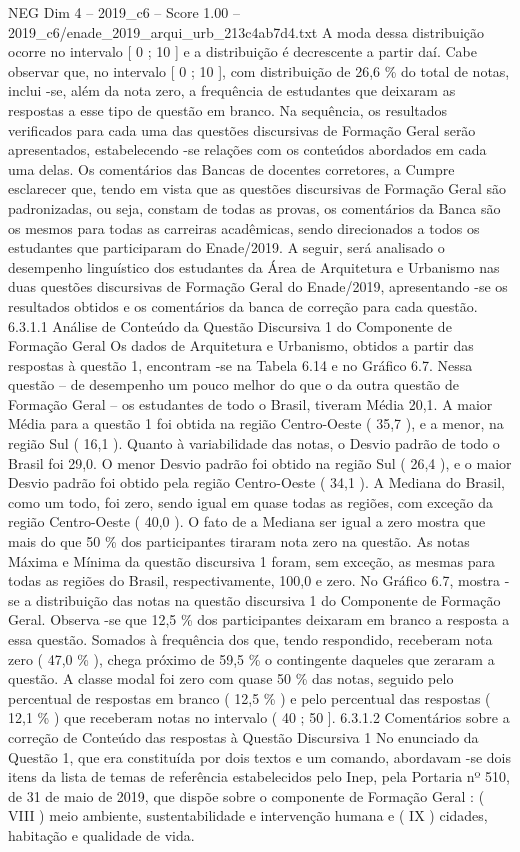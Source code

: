 \begin{textsample}{NEG Dim 4 – 2019\_c6 – Score 1.00 – 2019\_c6/enade\_2019\_arqui\_urb\_213c4ab7d4.txt}
A moda dessa distribuição ocorre no intervalo [ 0 ; 10 ] e a distribuição é decrescente a partir daí.
Cabe observar que, no intervalo [ 0 ; 10 ], com distribuição de 26,6 \% do total de notas, inclui -se, além da nota zero, a frequência de estudantes que deixaram as respostas a esse tipo de questão em branco.
Na sequência, os resultados verificados para cada uma das questões discursivas de Formação Geral serão apresentados, estabelecendo -se relações com os conteúdos abordados em cada uma delas.
Os comentários das Bancas de docentes corretores, a Cumpre esclarecer que, tendo em vista que as questões discursivas de Formação Geral são padronizadas, ou seja, constam de todas as provas, os comentários da Banca são os mesmos para todas as carreiras acadêmicas, sendo direcionados a todos os estudantes que participaram do Enade/2019.
A seguir, será analisado o desempenho linguístico dos estudantes da Área de Arquitetura e Urbanismo nas duas questões discursivas de Formação Geral do Enade/2019, apresentando -se os resultados obtidos e os comentários da banca de correção para cada questão. 6.3.1.1 Análise de Conteúdo da Questão Discursiva 1 do Componente de Formação Geral Os dados de Arquitetura e Urbanismo, obtidos a partir das respostas à questão 1, encontram -se na Tabela 6.14 e no Gráfico 6.7.
Nessa questão – de desempenho um pouco melhor do que o da outra questão de Formação Geral – os estudantes de todo o Brasil, tiveram Média 20,1.
A maior Média para a questão 1 foi obtida na região Centro-Oeste ( 35,7 ), e a menor, na região Sul ( 16,1 ).
Quanto à variabilidade das notas, o Desvio padrão de todo o Brasil foi 29,0.
O menor Desvio padrão foi obtido na região Sul ( 26,4 ), e o maior Desvio padrão foi obtido pela região Centro-Oeste ( 34,1 ).
A Mediana do Brasil, como um todo, foi zero, sendo igual em quase todas as regiões, com exceção da região Centro-Oeste ( 40,0 ).
O fato de a Mediana ser igual a zero mostra que mais do que 50 \% dos participantes tiraram nota zero na questão.
As notas Máxima e Mínima da questão discursiva 1 foram, sem exceção, as mesmas para todas as regiões do Brasil, respectivamente, 100,0 e zero.
No Gráfico 6.7, mostra -se a distribuição das notas na questão discursiva 1 do Componente de Formação Geral.
Observa -se que 12,5 \% dos participantes deixaram em branco a resposta a essa questão.
Somados à frequência dos que, tendo respondido, receberam nota zero ( 47,0 \% ), chega próximo de 59,5 \% o contingente daqueles que zeraram a questão.
A classe modal foi zero com quase 50 \% das notas, seguido pelo percentual de respostas em branco ( 12,5 \% ) e pelo percentual das respostas ( 12,1 \% ) que receberam notas no intervalo ( 40 ; 50 ]. 6.3.1.2 Comentários sobre a correção de Conteúdo das respostas à Questão Discursiva 1 No enunciado da Questão 1, que era constituída por dois textos e um comando, abordavam -se dois itens da lista de temas de referência estabelecidos pelo Inep, pela Portaria nº 510, de 31 de maio de 2019, que dispõe sobre o componente de Formação Geral : ( VIII ) meio ambiente, sustentabilidade e intervenção humana e ( IX ) cidades, habitação e qualidade de vida.

\end{textsample}

